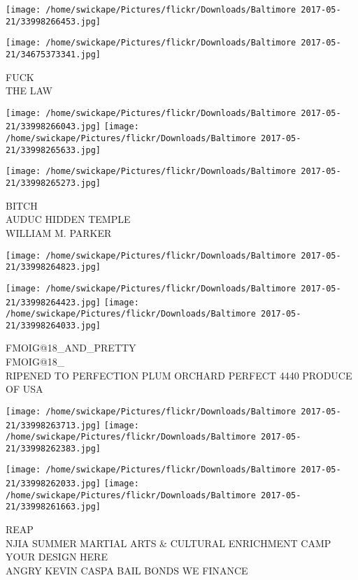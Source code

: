 \documentclass[10pt,letterpaper]{article}
\begin{document}
\texttt{[image: /home/swickape/Pictures/flickr/Downloads/Baltimore 2017-05-21/33998266453.jpg]}

\vspace{0.25in}
\texttt{[image: /home/swickape/Pictures/flickr/Downloads/Baltimore 2017-05-21/34675373341.jpg]}

FUCK\\
THE LAW\\
\pagebreak

\texttt{[image: /home/swickape/Pictures/flickr/Downloads/Baltimore 2017-05-21/33998266043.jpg]}
\texttt{[image: /home/swickape/Pictures/flickr/Downloads/Baltimore 2017-05-21/33998265633.jpg]}

\vspace{0.25in}
\texttt{[image: /home/swickape/Pictures/flickr/Downloads/Baltimore 2017-05-21/33998265273.jpg]}

BITCH\\
AUDUC HIDDEN TEMPLE\\
WILLIAM M. PARKER\\
\pagebreak

\texttt{[image: /home/swickape/Pictures/flickr/Downloads/Baltimore 2017-05-21/33998264823.jpg]}

\vspace{0.25in}
\texttt{[image: /home/swickape/Pictures/flickr/Downloads/Baltimore 2017-05-21/33998264423.jpg]}
\texttt{[image: /home/swickape/Pictures/flickr/Downloads/Baltimore 2017-05-21/33998264033.jpg]}

FMOIG@18\_AND\_PRETTY\\
FMOIG@18\_\\
RIPENED TO PERFECTION PLUM ORCHARD PERFECT 4440 PRODUCE OF USA\\
\pagebreak

\texttt{[image: /home/swickape/Pictures/flickr/Downloads/Baltimore 2017-05-21/33998263713.jpg]}
\texttt{[image: /home/swickape/Pictures/flickr/Downloads/Baltimore 2017-05-21/33998262383.jpg]}

\texttt{[image: /home/swickape/Pictures/flickr/Downloads/Baltimore 2017-05-21/33998262033.jpg]}
\texttt{[image: /home/swickape/Pictures/flickr/Downloads/Baltimore 2017-05-21/33998261663.jpg]}

REAP\\
NJIA SUMMER MARTIAL ARTS \& CULTURAL ENRICHMENT CAMP\\
YOUR DESIGN HERE\\
ANGRY KEVIN CASPA BAIL BONDS WE FINANCE\\
\pagebreak
\end{document}
